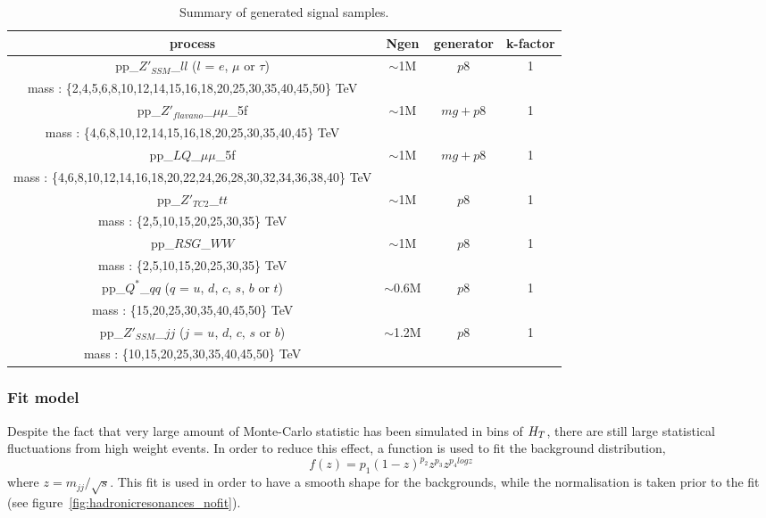 \begin{table}[!htb]\centering
\begin{tabular}{|c|c|c|c|}
\hline
\hline		
process & Ngen & generator & k-factor \\
\hline		
pp\_$Z'_{SSM}$\_$ll$ ($l$ = $e$, $\mu$ or $\tau$) & \multirow{2}{*}{$\sim$1M} & \multirow{2}{*}{$p8$} & \multirow{2}{*}{1} \\
mass : \{2,4,5,6,8,10,12,14,15,16,18,20,25,30,35,40,45,50\} TeV & & & \\
\hline		
pp\_$Z'_{flavano}$\_$\mu\mu$\_5f & \multirow{2}{*}{$\sim$1M} & \multirow{2}{*}{$mg+p8$} & \multirow{2}{*}{1} \\
mass : \{4,6,8,10,12,14,15,16,18,20,25,30,35,40,45\} TeV & & & \\
\hline		
pp\_$LQ$\_$\mu\mu$\_5f & \multirow{2}{*}{$\sim$1M} & \multirow{2}{*}{$mg+p8$} & \multirow{2}{*}{1} \\
mass : \{4,6,8,10,12,14,16,18,20,22,24,26,28,30,32,34,36,38,40\} TeV & & & \\
\hline		
pp\_$Z'_{TC2}$\_$tt$ & \multirow{2}{*}{$\sim$1M} & \multirow{2}{*}{$p8$} & \multirow{2}{*}{1} \\
mass : \{2,5,10,15,20,25,30,35\} TeV & & & \\
\hline		
pp\_$RSG$\_$WW$ & \multirow{2}{*}{$\sim$1M} & \multirow{2}{*}{$p8$} & \multirow{2}{*}{1} \\
mass : \{2,5,10,15,20,25,30,35\} TeV & & & \\
\hline		
pp\_$Q^*$\_$qq$ ($q$ = $u$, $d$, $c$, $s$, $b$ or $t$) & \multirow{2}{*}{$\sim$0.6M} & \multirow{2}{*}{$p8$} & \multirow{2}{*}{1} \\
mass : \{15,20,25,30,35,40,45,50\} TeV & & & \\
\hline		
pp\_$Z'_{SSM}$\_$jj$ ($j$ = $u$, $d$, $c$, $s$ or $b$) & \multirow{2}{*}{$\sim$1.2M} & \multirow{2}{*}{$p8$} & \multirow{2}{*}{1} \\
mass : \{10,15,20,25,30,35,40,45,50\} TeV & & & \\
\hline
\hline
\end{tabular}
\caption{Summary of generated signal samples.}
\label{tab:MCtable_sig}
\end{table}

\subsubsection{Fit model}
Despite the fact that very large amount of Monte-Carlo statistic has been simulated in bins of $H_{T}$, there are still large statistical fluctuations from high weight events.
In order to reduce this effect, a function is used to fit the background distribution,
\begin{equation}
f(z)=p_1(1-z)^{p_2}z^{p_3}z^{p_{4}logz}
\end{equation}
where $z=m_{jj}/\sqrt{s}$. This fit is used in order to have a smooth shape for the backgrounds, while the normalisation is taken prior to the fit (see figure~\ref{fig:hadronicresonances_nofit}).

